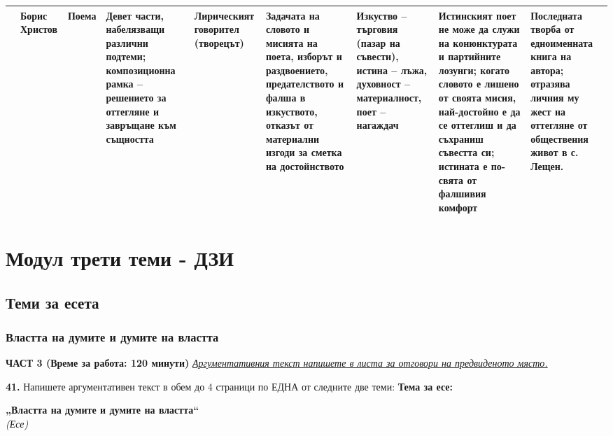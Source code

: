 \documentclass[12pt,a4paper]{article}
\begin{document}
\begin{tabular}{|L{1.4cm}|L{1.4cm}|L{1.4cm}|L{2.1cm}|L{2.3cm}|L{2.6cm}|L{2.1cm}|L{3.0cm}|L{1.3cm}|}
 &
Борис Христов &
Поема &
Девет части, набелязващи различни подтеми; композиционна рамка -- решението за оттегляне и завръщане към същността &
Лирическият говорител (творецът) &
Задачата на словото и мисията на поета, изборът и раздвоението, предателството и фалша в изкуството, отказът от материални изгоди за сметка на достойнството &
Изкуство -- търговия (пазар на съвести), истина -- лъжа, духовност -- материалност, поет -- нагаждач &
Истинският поет не може да служи на конюнктурата и партийните лозунги; когато словото е лишено от своята мисия, най-достойно е да се оттеглиш и да съхраниш съвестта си; истината е по-свята от фалшивия комфорт &
Последната творба от едноименната книга на автора; отразява личния му жест на оттегляне от обществения живот в с. Лещен. \\
\hline
\end{tabular}
\normalsize
\newpage

\newpage

\section{Модул трети теми - ДЗИ}
\subsection{Теми за есета}

\subsubsection{Властта на думите и думите на властта }
\vspace{0.5cm}
\begin{center}
\textbf{ЧАСТ 3 (Време за работа: 120 минути)}
\vspace{0.2cm}
{\textit{\underline{Аргументативния текст напишете в листа за отговори на предвиденото място.}}}
\vspace{0.1cm}
\end{center}
\textbf{41.} Напишете аргументативен текст в обем до 4 страници по ЕДНА от следните две теми:
\vspace{0.2cm}
\textbf{Тема за есе:}
\vspace{0.1cm}
\begin{center}
\textbf{„Властта на думите и думите на властта“}
\\
\textit{(Есе)}
\end{center}
\end{document}
